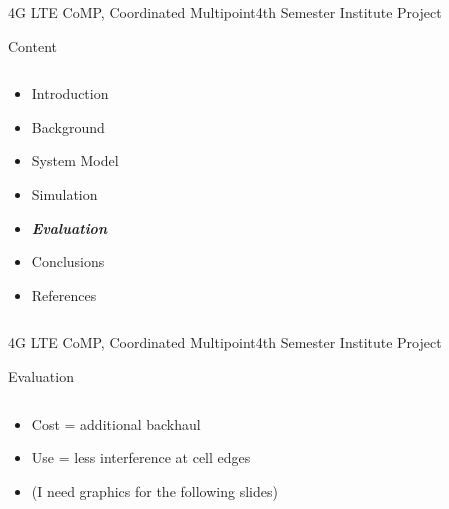 \documentclass[xcolor={cmyk}]{beamer}
\begin{document}
\begin{frame}{4G LTE CoMP, Coordinated Multipoint}{4th Semester Institute Project}
	\begin{block}{Content}
		\begin{columns}
			\begin{column}{.9\textwidth}
				\begin{itemize}
					\item Introduction
					\item Background
					\item System Model
					\item Simulation
					\item \textbf{\emph{Evaluation}}
					\item Conclusions
					\item References
				\end{itemize}
			\end{column}
		\end{columns}
	\end{block}
\end{frame}
 
 \begin{frame}{4G LTE CoMP, Coordinated Multipoint}{4th Semester Institute Project}
	 \begin{block}{Evaluation}
	 	\begin{columns}
			\begin{column}{.9\textwidth}
				\begin{itemize}
					\item Cost = additional backhaul
					\item Use = less interference at cell edges
					\item (I need graphics for the following slides)
				\end{itemize}
			\end{column}
		\end{columns}
	 \end{block}
 \end{frame}
 
\end{document}
